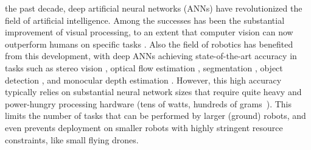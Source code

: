  the past decade, deep artificial neural networks (ANNs) have revolutionized the field of artificial intelligence. Among the successes has been the substantial improvement of visual processing, to an extent that computer vision can now outperform humans on specific tasks \cite{ciresan2011committee}. Also the field of robotics has benefited from this development, with deep ANNs achieving state-of-the-art accuracy in tasks such as stereo vision \cite{cheng2020hierarchical,gu2020cascade}, optical flow estimation \cite{ilg2017flownet,sun2018pwcnet,teed2020raft}, segmentation \cite{yuan2021segmentation,liu2022swin}, object detection \cite{girshick2015fast,redmon2018yolov3,xu2021endtoend}, and monocular depth estimation \cite{garg2016unsupervised,godard2017unsupervised,yuan2022new}.
However, this high accuracy typically relies on substantial neural network sizes that require quite heavy and power-hungry processing hardware (tens of watts, hundreds of grams~\cite{nvidia}). This limits the number of tasks that can be performed by larger (ground) robots, and even prevents deployment on smaller robots with highly stringent resource constraints, like small flying drones. 

